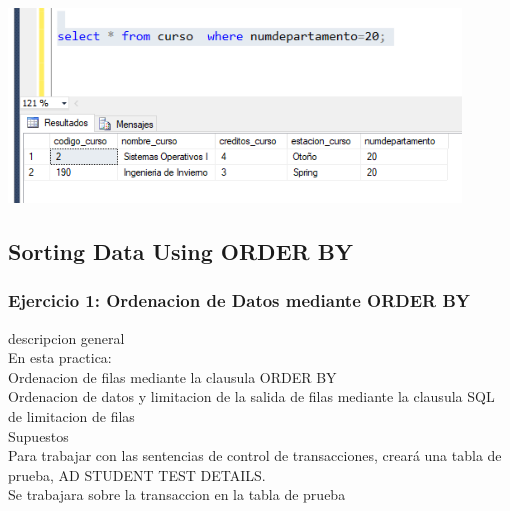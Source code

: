\documentclass[12pt,letterpaper]{article}
\begin{document}
\begin{enumerate}[1.]
\begin{center}
\includegraphics[width=12cm]{./IMAGENES/imagen10}
\end{center}


   
\end{enumerate}








\newpage
\subsection{Sorting Data Using ORDER BY} 

\subsubsection{Ejercicio 1: Ordenacion de Datos mediante ORDER BY} 
descripcion general  \\
En esta practica:\\
Ordenacion de filas mediante la clausula ORDER BY\\
 Ordenacion de datos y limitacion de la salida de filas mediante la clausula SQL de limitacion de filas
 \\
Supuestos\\
Para trabajar con las sentencias de control de transacciones, creará una tabla de prueba, AD STUDENT TEST DETAILS.\\
Se trabajara sobre la transaccion en la tabla de prueba\\
\end{document}
